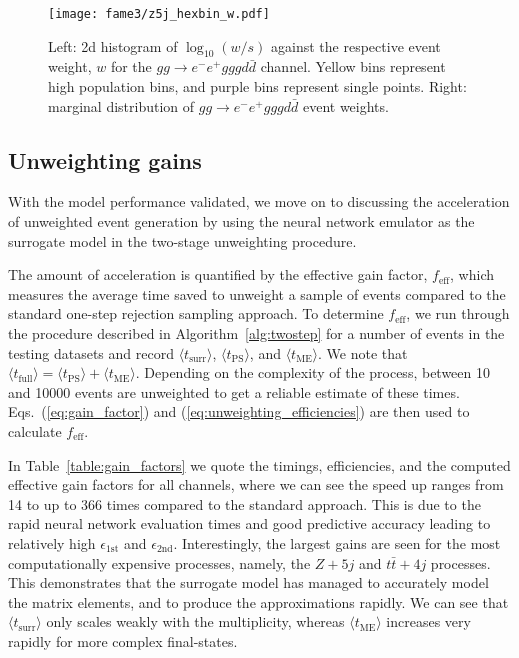 \documentclass[main.tex]{subfiles}
\begin{document}
\begin{figure}
    \texttt{[image: fame3/z5j\_hexbin\_w.pdf]}
    \caption{Left: 2d histogram of $\log_{10}(w/s)$ against the respective
    event weight, $w$ for the $gg \rightarrow e^{-}e^{+}gggd\bar{d}$ channel.
    Yellow bins represent high population bins, and purple bins represent
    single points. Right: marginal distribution of $gg \rightarrow e^{-}e^{+}gggd\bar{d}$
    event weights.}
    \label{fig:pp_2d_hist_z5j}
\end{figure}

\subsection{Unweighting gains}
With the model performance validated, we move on to discussing
the acceleration of unweighted event generation by using
the neural network emulator as the surrogate model in the two-stage
unweighting procedure.

The amount of acceleration is quantified by the effective gain factor,
$f_{\mathrm{eff}}$, which measures the average time saved to
unweight a sample of events compared to the standard
one-step rejection sampling approach. To determine $f_{\mathrm{eff}}$,
we run through the procedure described in Algorithm~\ref{alg:twostep}
for a number of events in the testing datasets and record
$\langle t_{\mathrm{surr}} \rangle$, $\langle t_{\mathrm{PS}} \rangle$, and
$\langle t_{\mathrm{ME}} \rangle$.
We note that $\langle t_{\mathrm{full}} \rangle = \langle t_{\mathrm{PS}} \rangle + \langle t_{\mathrm{ME}} \rangle$.
Depending on the complexity
of the process, between 10 and 10000 events are unweighted to get a reliable
estimate of these times. Eqs.~(\ref{eq:gain_factor}) and
(\ref{eq:unweighting_efficiencies}) are then used to calculate $f_{\mathrm{eff}}$.

In Table~\ref{table:gain_factors} we quote the timings, efficiencies,
and the computed effective gain factors for all channels,
where we can see the speed up ranges from 14 to up to 366 times
compared to the standard approach. This is due to the rapid
neural network evaluation times and good predictive accuracy leading
to relatively high $\epsilon_{\mathrm{1st}}$ and $\epsilon_{\mathrm{2nd}}$.
Interestingly, the largest
gains are seen for the most computationally expensive processes,
namely, the $Z+5j$ and $t\bar{t}+4j$ processes. This demonstrates
that the surrogate model has managed to accurately model the matrix
elements, and to produce the approximations rapidly. We can
see that $\langle t_{\mathrm{surr}} \rangle$ only scales weakly
with the multiplicity, whereas $\langle t_{\mathrm{ME}} \rangle$
increases very rapidly for more complex final-states.
\end{document}
